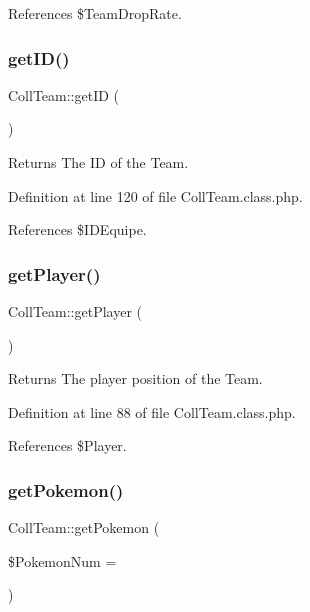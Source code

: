 References \$\+Team\+Drop\+Rate.

\mbox{\label{class_coll_team_a6d55a9b5373a7b8905de9d695c419c63}} 
\subsubsection{\texorpdfstring{get\+I\+D()}{getID()}}
{\footnotesize\ttfamily Coll\+Team\+::get\+ID (\begin{DoxyParamCaption}{ }\end{DoxyParamCaption})}

\begin{DoxyReturn}{Returns}
The ID of the Team. 
\end{DoxyReturn}


Definition at line 120 of file Coll\+Team.\+class.\+php.



References \$\+I\+D\+Equipe.

\mbox{\label{class_coll_team_ad24055af018ae4cc71df690017bf831a}} 
\subsubsection{\texorpdfstring{get\+Player()}{getPlayer()}}
{\footnotesize\ttfamily Coll\+Team\+::get\+Player (\begin{DoxyParamCaption}{ }\end{DoxyParamCaption})}

\begin{DoxyReturn}{Returns}
The player position of the Team. 
\end{DoxyReturn}


Definition at line 88 of file Coll\+Team.\+class.\+php.



References \$\+Player.

\mbox{\label{class_coll_team_ae1e4060b9948048d96ee81555936f04a}} 
\subsubsection{\texorpdfstring{get\+Pokemon()}{getPokemon()}}
{\footnotesize\ttfamily Coll\+Team\+::get\+Pokemon (\begin{DoxyParamCaption}\item[{}]{\$\+Pokemon\+Num = {} }\end{DoxyParamCaption})}


